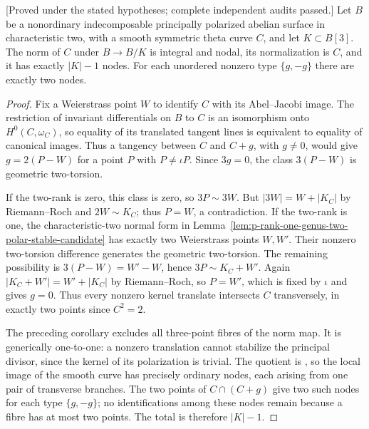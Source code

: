 \begin{corollary}
\label{cor:nonordinary-theta-three-torsion-nodal-norm-candidate}
\textup{[Proved under the stated hypotheses; complete independent audits passed.]}
Let $B$ be a nonordinary indecomposable principally polarized
abelian surface in characteristic two, with a smooth symmetric
theta curve $C$, and let $K\subset B[3]$. The norm of $C$ under
$B\to B/K$ is integral and nodal, its normalization is $C$,
and it has exactly $|K|-1$ nodes. For each unordered nonzero type
$\{g,-g\}$ there are exactly two nodes.
\end{corollary}
\begin{proof}
Fix a Weierstrass point $W$ to identify $C$ with its Abel--Jacobi
image. The restriction of invariant differentials on $B$ to $C$
is an isomorphism onto $H^0(C,\omega_C)$, so equality of its
translated tangent lines is equivalent to equality of canonical
images. Thus a tangency between $C$ and $C+g$, with $g\ne0$,
would give $g=2(P-W)$ for a point $P$ with $P\ne\iota P$.
Since $3g=0$, the class $3(P-W)$ is geometric two-torsion.

If the two-rank is zero, this class is zero, so $3P\sim3W$.
But $|3W|=W+|K_C|$ by Riemann--Roch and $2W\sim K_C$;
thus $P=W$, a contradiction. If the two-rank is one, the
characteristic-two normal form in
Lemma~\ref{lem:p-rank-one-genus-two-polar-stable-candidate}
has exactly two Weierstrass points $W,W'$. Their nonzero
two-torsion difference generates the geometric two-torsion.
The remaining possibility is $3(P-W)=W'-W$, hence
$3P\sim K_C+W'$. Again $|K_C+W'|=W'+|K_C|$ by
Riemann--Roch, so $P=W'$, which is fixed by $\iota$ and gives
$g=0$. Thus every nonzero kernel translate intersects $C$
transversely, in exactly two points since $C^2=2$.

The preceding corollary excludes all three-point fibres of the
norm map. It is generically one-to-one: a nonzero translation
cannot stabilize the principal divisor, since the kernel of its
polarization is trivial. The quotient is \etale, so the local
image of the smooth curve has precisely ordinary nodes, each
arising from one pair of transverse branches. The two points of
$C\cap(C+g)$ give two such nodes for each type $\{g,-g\}$;
no identifications among these nodes remain because a fibre has
at most two points. The total is therefore $|K|-1$.
\end{proof}

